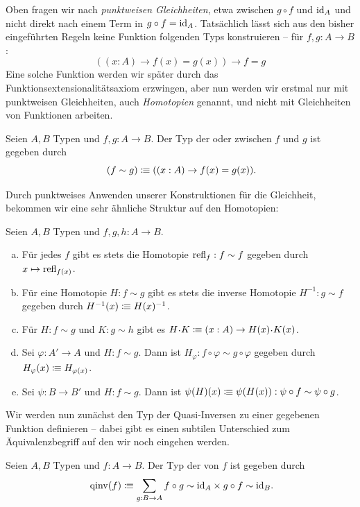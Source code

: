 Oben fragen wir nach \emph{punktweisen Gleichheiten}, etwa zwischen $g\circ f$ und $\mathrm{id}_A$ und
nicht direkt nach einem Term in $g\circ f = \mathrm{id}_A$.
Tatsächlich lässt sich aus den bisher eingeführten Regeln keine Funktion folgenden Typs konstruieren -- für $f,g:A\to B$:
\[
  ((x:A)\to f(x)=g(x))\to f=g
\]
Eine solche Funktion werden wir später durch das Funktionsextensionalitätsaxiom erzwingen,
aber nun werden wir erstmal nur mit punktweisen Gleichheiten, auch \emph{Homotopien} genannt, und nicht mit Gleichheiten von Funktionen arbeiten.

\begin{definition}
  Seien $A,B$ Typen und $f,g:A\to B$.
  Der Typ der 
  oder  zwischen $f$ und $g$
  ist gegeben durch
  \[
    (f\sim g)\colonequiv( (x:A)\to f(x)=g(x))\rlap{.}
  \]
\end{definition}

Durch punktweises Anwenden unserer Konstruktionen für die Gleichheit,
bekommen wir eine sehr ähnliche Struktur auf den Homotopien:

\begin{definition}
  Seien $A,B$ Typen und $f,g,h:A\to B$.
  \begin{enumerate}[(a)]
  \item Für jedes $f$ gibt es stets die Homotopie $\mathrm{refl}_f:f\sim f$ gegeben durch $x\mapsto \mathrm{refl}_{f(x)}$.
  \item Für eine Homotopie $H:f\sim g$ gibt es stets die inverse Homotopie $H^{-1}:g\sim f$ gegeben durch $H^{-1}(x)\vcentcolon\mspace{-1.2mu}\equiv H(x)^{-1}$.
  \item Für $H:f\sim g$ und $K:g\sim h$ gibt es $H\kon K\colonequiv (x:A)\to H(x)\kon K(x)$.
  \item Sei $\varphi:A'\to A$ und $H:f\sim g$.
    Dann ist $H_\varphi:f\circ \varphi \sim g\circ \varphi$ gegeben durch $H_\varphi(x)\vcentcolon\mspace{-1.2mu}\equiv H_{\varphi(x)}$.
  \item Sei $\psi:B\to B'$ und $H:f\sim g$. Dann ist $\psi(H)(x)\vcentcolon\mspace{-1.2mu}\equiv \psi(H(x)):\psi\circ f\sim\psi\circ g$.
  \end{enumerate}
\end{definition}

Wir werden nun zunächst den Typ der Quasi-Inversen zu einer gegebenen Funktion definieren
-- dabei gibt es einen subtilen Unterschied zum Äquivalenzbegriff auf den wir noch eingehen werden.

\begin{definition}
  Seien $A,B$ Typen und $f:A\to B$. Der Typ der  von $f$ ist gegeben durch
  \[
    \qinv(f)\colonequiv \sum_{g:B\to A} f\circ g\sim \id_A\times g\circ f\sim \id_B\rlap{.}
  \]
\end{definition}

